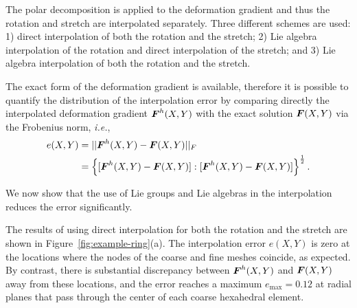 \documentclass[12pt]{article}
\begin{document}
The polar decomposition is applied to the deformation gradient and thus
the rotation and stretch are interpolated separately. Three different
schemes are used: 1) direct interpolation of both the rotation and the
stretch; 2) Lie algebra interpolation of the rotation and direct
interpolation of the stretch; and 3) Lie algebra interpolation of both
the rotation and the stretch.

The exact form of the deformation gradient is available, therefore it
is possible to quantify the distribution of the interpolation error by
comparing directly the interpolated deformation gradient
${\boldsymbol{F}}^{h}(X,Y)$ with the exact solution ${\boldsymbol{F}}(X,Y)$ via the Frobenius
norm, \emph{i.e.},
\begin{align}
  e(X,Y) & =
  ||{\boldsymbol{F}}^{h}(X,Y) - {\boldsymbol{F}}(X,Y)||_{F} \nonumber
  \\
  & =
  \left\{
    [{\boldsymbol{F}}^{h}(X,Y) - {\boldsymbol{F}}(X,Y)] : [{\boldsymbol{F}}^{h}(X,Y)- {\boldsymbol{F}}(X,Y)]
  \right\}^{\frac{1}{2}}.
  \label{eq:Frobenius-norm-distribution}
\end{align} 

We now show that the use of Lie groups and Lie algebras in the
interpolation reduces the error significantly.

The results of using direct interpolation for both the rotation and the stretch
are shown in Figure~\ref{fig:example-ring}(a). The interpolation error $e(X,Y)$
is zero at the locations where the nodes of the coarse and fine meshes coincide,
as expected. By contrast, there is substantial discrepancy between
${\boldsymbol{F}}^{h}(X,Y)$ and ${\boldsymbol{F}}(X,Y)$ away from these locations, and the error reaches a
maximum $e_{\text{max}} = 0.12$ at radial planes that pass through the center of
each coarse hexahedral element.
\end{document}
